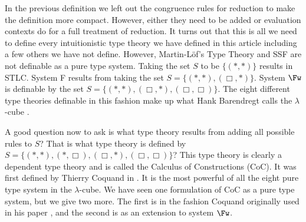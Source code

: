 In the previous definition we left out the congruence rules for
reduction to make the definition more compact.  However, either they
need to be added or evaluation contexts do for a full treatment of
reduction.  It turns out that this is all we need to define every
intuitionistic type theory we have defined in this article including a
few others we have not define. However, Martin-L\"of's Type Theory and
SSF are not definable as a pure type system.  Taking the set $S$ to be
$\{ (*,*)
\}$ results in STLC.  System F results from taking the set $S = \{
(*,*),(\Box,*) \}$. System $\Fw$ is definable by the set $S =
\{(*,*),(\Box,*),(\Box,\Box)\}$.  The eight different type
theories definable in this fashion make up what Hank Barendregt
calls the $\lambda$-cube \cite{Barendregt:1992}.  

A good question now to ask is what type theory results from adding all
possible rules to $S$?  That is what type theory is defined by $S = \{
(*,*), (*, \Box), (\Box,*), (\Box,\Box)\}$?  This type theory is
clearly a dependent type theory and is called the Calculus of
Constructions (CoC).  It was first defined by Thierry Coquand in
\cite{Coquand:1988}.  It is the most powerful of all the eight pure type
system in the $\lambda$-cube.  We have seen one formulation of CoC as
a pure type system, but we give two more.  The first is in the fashion
Coquand originally used in his paper
\cite{Coquand:1988}, and the second is as an extension to system
$\Fw$.  

